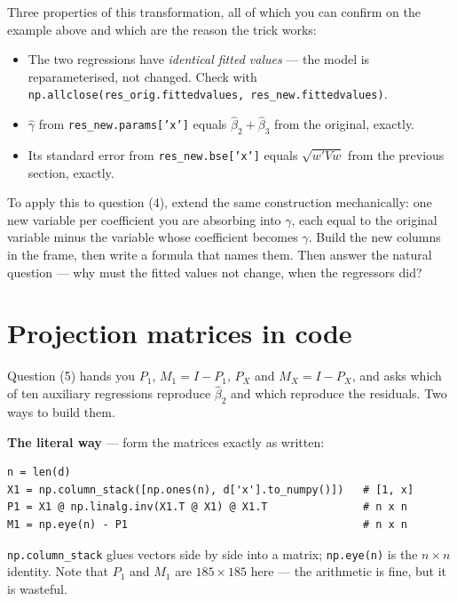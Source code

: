\documentclass[11pt]{article}
\newcommand{\code}[1]{\texttt{#1}}
\begin{document}
\noindent Three properties of this transformation, all of which you can confirm
on the example above and which are the reason the trick works:

\begin{itemize}[leftmargin=1.4em,itemsep=2pt]
  \item The two regressions have \emph{identical fitted values} --- the model is
        reparameterised, not changed. Check with
        \code{np.allclose(res\_orig.fittedvalues, res\_new.fittedvalues)}.
  \item $\hat\gamma$ from \code{res\_new.params['x']} equals
        $\hat\beta_2 + \hat\beta_3$ from the original, exactly.
  \item Its standard error from \code{res\_new.bse['x']} equals
        $\sqrt{w'Vw}$ from the previous section, exactly.
\end{itemize}

\noindent To apply this to question (4), extend the same construction
mechanically: one new variable per coefficient you are absorbing into
$\gamma$, each equal to the original variable minus the variable whose
coefficient becomes $\gamma$. Build the new columns in the frame, then write a
formula that names them. Then answer the natural question --- why must the
fitted values not change, when the regressors did?

\section{Projection matrices in code}

Question (5) hands you $P_1$, $M_1 = I - P_1$, $P_X$ and $M_X = I - P_X$, and
asks which of ten auxiliary regressions reproduce $\hat\beta_2$ and which
reproduce the residuals. Two ways to build them.

\noindent\textbf{The literal way} --- form the matrices exactly as written:

\begin{lstlisting}
n = len(d)
X1 = np.column_stack([np.ones(n), d['x'].to_numpy()])   # [1, x]
P1 = X1 @ np.linalg.inv(X1.T @ X1) @ X1.T               # n x n
M1 = np.eye(n) - P1                                     # n x n
\end{lstlisting}

\noindent\code{np.column\_stack} glues vectors side by side into a matrix;
\code{np.eye(n)} is the $n \times n$ identity. Note that $P_1$ and $M_1$ are
$185 \times 185$ here --- the arithmetic is fine, but it is wasteful.
\end{document}

